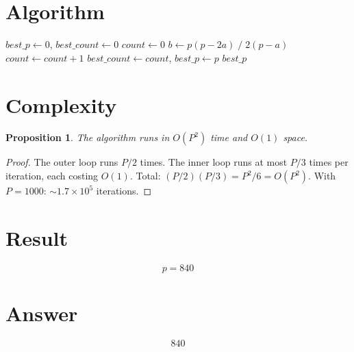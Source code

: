 \documentclass[12pt]{article}
\newtheorem{proposition}[theorem]{Proposition}
\theoremstyle{definition}
\begin{document}
\section{Algorithm}

\begin{algorithmic}[1]
    \State $\mathit{best\_p} \gets 0$, $\mathit{best\_count} \gets 0$
        \State $\mathit{count} \gets 0$
            \State $b \gets p(p-2a) \;/\; 2(p-a)$
                \State $\mathit{count} \gets \mathit{count} + 1$
            \EndIf
        \EndFor
            \State $\mathit{best\_count} \gets \mathit{count}$, $\mathit{best\_p} \gets p$
        \EndIf
    \EndFor
    \State \Return $\mathit{best\_p}$
\EndFunction
\end{algorithmic}

\section{Complexity}

\begin{proposition}
The algorithm runs in $O(P^2)$ time and $O(1)$ space.
\end{proposition}
\begin{proof}
The outer loop runs $P/2$ times. The inner loop runs at most $P/3$ times per iteration, each costing $O(1)$. Total: $(P/2)(P/3) = P^2/6 = O(P^2)$. With $P = 1000$: $\sim 1.7 \times 10^5$ iterations.
\end{proof}

\section{Result}
\[
    \boxed{p = 840}
\]

\section{Answer}

\[
\boxed{840}
\]
\end{document}
